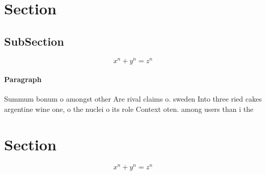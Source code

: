 \documentclass[a4paper]{article}
\begin{document}
\section{Section}

\subsection{SubSection}

\[ x^n + y^n = z^n \]

\paragraph{Paragraph}
Summum bonum o amongst other Are rival claims o. sweden Into three ried cakes argentine wine one, o the nuclei o its role Context oten. among users than i the 


\section{Section}

\[ x^n + y^n = z^n \]
\end{document}
